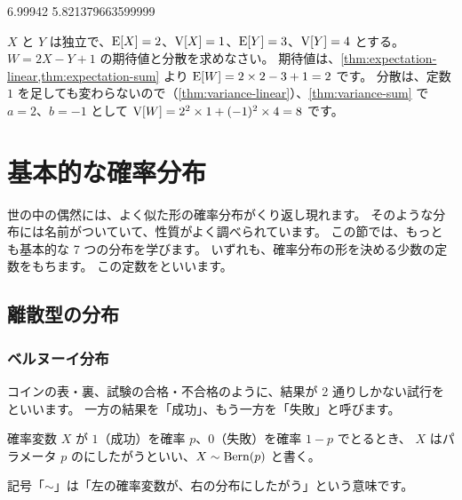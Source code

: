 \begin{pyoutput}
6.99942
5.821379663599999
\end{pyoutput}

\begin{problem}
  $X$ と $Y$ は独立で、$\mathrm{E}[X] = 2$、$\mathrm{V}[X] = 1$、$\mathrm{E}[Y] = 3$、$\mathrm{V}[Y] = 4$ とする。
  $W = 2X - Y + 1$ の期待値と分散を求めなさい。
  \tcblower
  期待値は、\cref{thm:expectation-linear,thm:expectation-sum} より
  $\mathrm{E}[W] = 2 \times 2 - 3 + 1 = 2$ です。
  分散は、定数 $1$ を足しても変わらないので（\cref{thm:variance-linear}）、\cref{thm:variance-sum} で $a = 2$、$b = -1$ として
  $\mathrm{V}[W] = 2^2 \times 1 + (-1)^2 \times 4 = 8$ です。
\end{problem}

\section{基本的な確率分布}
\label{sec:stat-basic-distributions}

世の中の偶然には、よく似た形の確率分布がくり返し現れます。
そのような分布には名前がついていて、性質がよく調べられています。
この節では、もっとも基本的な 7 つの分布を学びます。
いずれも、確率分布の形を決める少数の定数をもちます。
この定数をといいます。

\subsection{離散型の分布}

\subsubsection*{ベルヌーイ分布}

コインの表・裏、試験の合格・不合格のように、結果が 2 通りしかない試行をといいます。
一方の結果を「成功」、もう一方を「失敗」と呼びます。

\begin{definition}
  確率変数 $X$ が $1$（成功）を確率 $p$、$0$（失敗）を確率 $1 - p$ でとるとき、
  $X$ はパラメータ $p$ のにしたがうといい、$X \sim \mathrm{Bern}(p)$ と書く。
\end{definition}

記号「$\sim$」は「左の確率変数が、右の分布にしたがう」という意味です。

